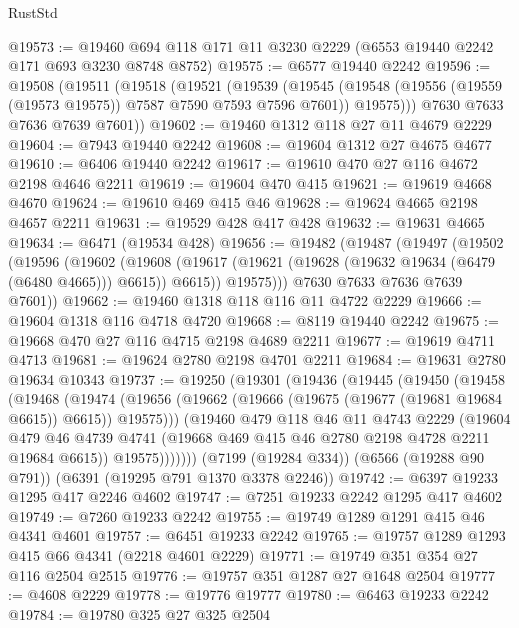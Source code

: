 \begin{lexlean}{RustStd}
\begin{coremodule}
@19573 := @19460 @694 @118 @171 @11 @3230 @2229 (@6553 @19440 @2242 @171 @693 @3230 @8748 @8752)
@19575 := @6577 @19440 @2242
@19596 := @19508
    (@19511
      (@19518
        (@19521
          (@19539
            (@19545
              (@19548 (@19556 (@19559 (@19573 @19575)) @7587 @7590 @7593 @7596 @7601))
              @19575)))
        @7630
        @7633
        @7636
        @7639
        @7601))
@19602 := @19460 @1312 @118 @27 @11 @4679 @2229
@19604 := @7943 @19440 @2242
@19608 := @19604 @1312 @27 @4675 @4677
@19610 := @6406 @19440 @2242
@19617 := @19610 @470 @27 @116 @4672 @2198 @4646 @2211
@19619 := @19604 @470 @415
@19621 := @19619 @4668 @4670
@19624 := @19610 @469 @415 @46
@19628 := @19624 @4665 @2198 @4657 @2211
@19631 := @19529 @428 @417 @428
@19632 := @19631 @4665
@19634 := @6471 (@19534 @428)
@19656 := @19482
    (@19487
      (@19497
        (@19502
          (@19596
            (@19602
              (@19608 (@19617 (@19621 (@19628 (@19632 @19634 (@6479 (@6480 @4665))) @6615)) @6615))
              @19575)))
        @7630
        @7633
        @7636
        @7639
        @7601))
@19662 := @19460 @1318 @118 @116 @11 @4722 @2229
@19666 := @19604 @1318 @116 @4718 @4720
@19668 := @8119 @19440 @2242
@19675 := @19668 @470 @27 @116 @4715 @2198 @4689 @2211
@19677 := @19619 @4711 @4713
@19681 := @19624 @2780 @2198 @4701 @2211
@19684 := @19631 @2780 @19634 @10343
@19737 := @19250
    (@19301
      (@19436
        (@19445
          (@19450
            (@19458
              (@19468
                (@19474
                  (@19656 (@19662 (@19666 (@19675 (@19677 (@19681 @19684 @6615)) @6615)) @19575)))
                (@19460
                  @479
                  @118
                  @46
                  @11
                  @4743
                  @2229
                  (@19604
                    @479
                    @46
                    @4739
                    @4741
                    (@19668 @469 @415 @46 @2780 @2198 @4728 @2211 @19684 @6615))
                  @19575)))))))
    (@7199 (@19284 @334))
    (@6566 (@19288 @90 @791))
    (@6391 (@19295 @791 @1370 @3378 @2246))
@19742 := @6397 @19233 @1295 @417 @2246 @4602
@19747 := @7251 @19233 @2242 @1295 @417 @4602
@19749 := @7260 @19233 @2242
@19755 := @19749 @1289 @1291 @415 @46 @4341 @4601
@19757 := @6451 @19233 @2242
@19765 := @19757 @1289 @1293 @415 @66 @4341 (@2218 @4601 @2229)
@19771 := @19749 @351 @354 @27 @116 @2504 @2515
@19776 := @19757 @351 @1287 @27 @1648 @2504
@19777 := @4608 @2229
@19778 := @19776 @19777
@19780 := @6463 @19233 @2242
@19784 := @19780 @325 @27 @325 @2504

\end{coremodule}
\end{lexlean}
